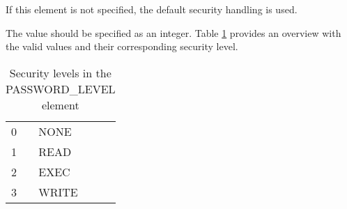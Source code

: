 \documentclass[a4paper]{book}
\newcommand{\vs}{\vspace{3mm}}
\begin{document}
If this element is not specified, the default security handling is used.

\vs

The value should be specified as an integer. Table \ref{tab:seclevelint}
provides an overview with the valid values and their corresponding security level.

\begin{table}[h!tb]
\begin{minipage}[h!tb]{\textwidth}
\begin{tabular}{ll}\hline
0 & NONE \\
1 & READ \\
2 & EXEC \\
3 & WRITE \\ \hline
\end{tabular} \newline 
\caption{Security levels in the PASSWORD{\_}LEVEL element}\label{tab:seclevelint}
\end{minipage}
\end{table}
\end{document}
